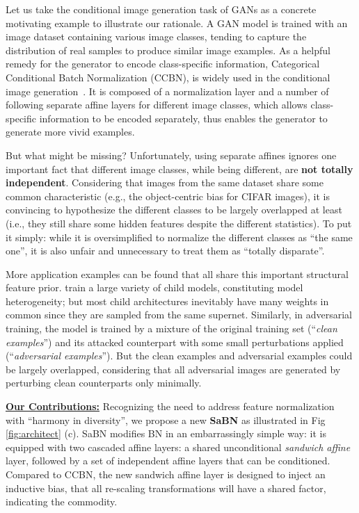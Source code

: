 \documentclass{article}
\begin{document}
Let us take the conditional image generation task of GANs as a concrete motivating example to illustrate our rationale. A GAN model is trained with an image dataset containing various image classes, tending to capture the distribution of real samples to produce similar image examples. As a helpful remedy for the generator to encode class-specific information, Categorical Conditional Batch Normalization (CCBN), is widely used in the conditional image generation~\cite{brock2018large, miyato2018spectral, miyato2018cgans}. It is composed of a normalization layer and a number of following separate affine layers for different image classes, which allows class-specific information to be encoded separately, thus enables the generator to generate more vivid examples.

But what might be missing? Unfortunately, using separate affines ignores one important fact that different image classes, while being different, are \textbf{not totally independent}. Considering that images from the same dataset share some common characteristic  (e.g., the object-centric bias for CIFAR images), it is convincing to hypothesize the different classes to be largely overlapped at least (i.e., they still share some hidden features despite the different statistics). To put it simply: while it is oversimplified to normalize the different classes as ``the same one'', it is also unfair and unnecessary to treat them as ``totally disparate''. 

More application examples can be found that all share this important structural feature prior. \citep{liu2018darts,dong2019searching,yu2018slimmable} train a large variety of child models, constituting model heterogeneity; but most child architectures inevitably have many weights in common since they are sampled from the same supernet. Similarly, in adversarial training, the model is trained by a mixture of the original training set (``\textit{clean examples}'') and its attacked counterpart with some small perturbations applied (``\textit{adversarial examples}''). But the clean examples and adversarial examples could be largely overlapped, considering that all adversarial images are generated by perturbing clean counterparts only minimally.

\underline{\textbf{Our Contributions:}} Recognizing the need to address feature normalization with ``harmony in diversity'', we propose a new \textbf{SaBN} as illustrated in Fig \ref{fig:architect} (c). SaBN modifies BN in an embarrassingly simple way: it is equipped with two cascaded affine layers: a shared unconditional \textit{sandwich affine} layer, followed by a set of independent affine layers that can be conditioned. Compared to CCBN, the new sandwich affine layer is designed to inject an inductive bias, that all re-scaling transformations will have a shared factor, indicating the commodity. 
\end{document}
